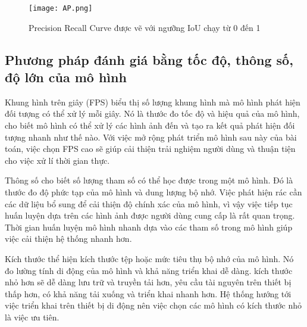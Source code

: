 \documentclass[../the.tex]{subfiles}
\begin{document}
\begin{figure}[H]
	\centering
	\texttt{[image: AP.png]}
	\caption{Precision Recall Curve được vẽ với ngưỡng IoU chạy từ 0 đến 1}
	\label{fig:ap}
\end{figure}

\subsection{Phương pháp đánh giá bằng tốc độ, thông số, độ lớn của mô hình}

{\fontsize{13}{12} \selectfont

	Khung hình trên giây (FPS) biểu thị số lượng khung hình mà mô hình phát hiện đối tượng có thể xử lý mỗi giây. Nó là thước đo tốc độ và hiệu quả của mô hình, cho biết mô hình có thể xử lý các hình ảnh đến và tạo ra kết quả phát hiện đối tượng nhanh như thế nào.
	Với việc mở rộng phát triển mô hình sau này của bài toán, việc chọn FPS cao sẽ giúp cải thiện trải nghiệm người dùng và thuận tiện cho việc xử lí thời gian thực.

	Thông số cho biết số lượng tham số có thể học được trong một mô hình. Đó là thước đo độ phức tạp của mô hình và dung lượng bộ nhớ. Việc phát hiện rác cần các dữ liệu bổ sung để cải thiện độ chính xác của mô hình, vì vậy việc tiếp tục huấn luyện dựa trên các hình ảnh được người dùng cung cấp là rất quan trọng.
	Thời gian huấn luyện mô hình nhanh dựa vào các tham số trong mô hình giúp việc cải thiện hệ thống nhanh hơn.

	Kích thước thể hiện kích thước tệp hoặc mức tiêu thụ bộ nhớ của mô hình. Nó đo lường tính di động của mô hình và khả năng triển khai dễ dàng.
	kích thước nhỏ hơn sẽ dễ dàng lưu trữ và truyền tải hơn, yêu cầu tài nguyên trên thiết bị thấp hơn, có khả năng tải xuống và triển khai nhanh hơn. Hệ thống hướng tới việc triển khai trên thiết bị di động nên việc chọn các mô hình có kích thước nhỏ là việc ưu tiên.

}
\end{document}
